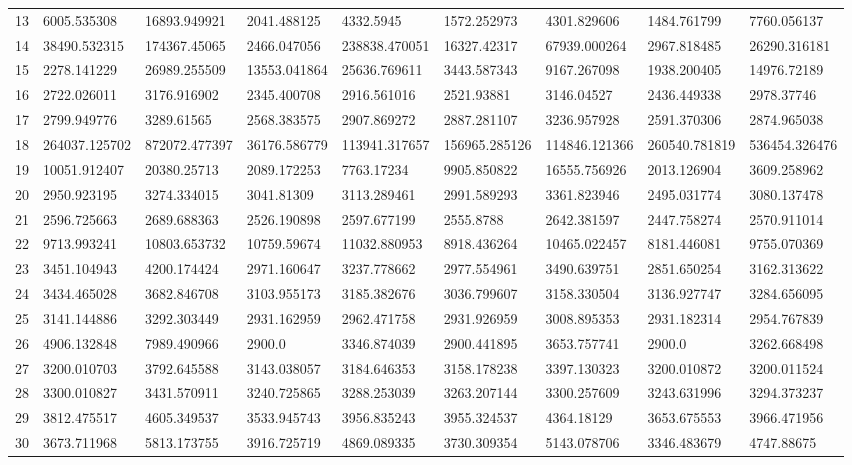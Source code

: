 \begin{table*}[b!]
\begin{tabular}{|p{0.8cm}|p{1.6cm}|p{1.6cm}|p{1.6cm}|p{1.6cm}|p{1.6cm}|p{1.6cm}|p{1.6cm}|p{1.6cm}|}
13  & 6005.535308 & 16893.949921 & 2041.488125 & 4332.5945 & 1572.252973 & 4301.829606 & 1484.761799 & 7760.056137 \\ 
14  & 38490.532315 & 174367.45065 & 2466.047056 & 238838.470051 & 16327.42317 & 67939.000264 & 2967.818485 & 26290.316181 \\ 
15  & 2278.141229 & 26989.255509 & 13553.041864 & 25636.769611 & 3443.587343 & 9167.267098 & 1938.200405 & 14976.72189 \\ 
16  & 2722.026011 & 3176.916902 & 2345.400708 & 2916.561016 & 2521.93881 & 3146.04527 & 2436.449338 & 2978.37746 \\ 
17  & 2799.949776 & 3289.61565 & 2568.383575 & 2907.869272 & 2887.281107 & 3236.957928 & 2591.370306 & 2874.965038 \\ 
18  & 264037.125702 & 872072.477397 & 36176.586779 & 113941.317657 & 156965.285126 & 114846.121366 & 260540.781819 & 536454.326476 \\ 
19  & 10051.912407 & 20380.25713 & 2089.172253 & 7763.17234 & 9905.850822 & 16555.756926 & 2013.126904 & 3609.258962 \\ 
20  & 2950.923195 & 3274.334015 & 3041.81309 & 3113.289461 & 2991.589293 & 3361.823946 & 2495.031774 & 3080.137478 \\ 
21  & 2596.725663 & 2689.688363 & 2526.190898 & 2597.677199 & 2555.8788 & 2642.381597 & 2447.758274 & 2570.911014 \\ 
22  & 9713.993241 & 10803.653732 & 10759.59674 & 11032.880953 & 8918.436264 & 10465.022457 & 8181.446081 & 9755.070369 \\ 
23  & 3451.104943 & 4200.174424 & 2971.160647 & 3237.778662 & 2977.554961 & 3490.639751 & 2851.650254 & 3162.313622 \\ 
24  & 3434.465028 & 3682.846708 & 3103.955173 & 3185.382676 & 3036.799607 & 3158.330504 & 3136.927747 & 3284.656095 \\ 
25  & 3141.144886 & 3292.303449 & 2931.162959 & 2962.471758 & 2931.926959 & 3008.895353 & 2931.182314 & 2954.767839 \\ 
26  & 4906.132848 & 7989.490966 & 2900.0 & 3346.874039 & 2900.441895 & 3653.757741 & 2900.0 & 3262.668498 \\ 
27  & 3200.010703 & 3792.645588 & 3143.038057 & 3184.646353 & 3158.178238 & 3397.130323 & 3200.010872 & 3200.011524 \\ 
28  & 3300.010827 & 3431.570911 & 3240.725865 & 3288.253039 & 3263.207144 & 3300.257609 & 3243.631996 & 3294.373237 \\ 
29  & 3812.475517 & 4605.349537 & 3533.945743 & 3956.835243 & 3955.324537 & 4364.18129 & 3653.675553 & 3966.471956 \\ 
30  & 3673.711968 & 5813.173755 & 3916.725719 & 4869.089335 & 3730.309354 & 5143.078706 & 3346.483679 & 4747.88675 \\ 
\hline

\end{tabular}
\end{table*}

